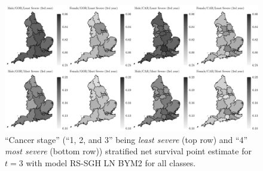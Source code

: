 \documentclass[10pt, aspectratio = 169, handout]{beamer} %
\begin{document}
    \begin{frame}[t]
		\frametitle{}
		\justifying
        \vspace{-2pt}
        \begin{figure}[!ht]
            \centering
            \includegraphics[width = 1\textwidth]{Images/cs01-t3-mean-cancer.jpg}
            \caption{``Cancer stage'' (``1, 2, and 3'' being \textit{least severe} (top row) and ``4'' \textit{most severe} (bottom row)) stratified net survival point estimate for $t = 3$ with model RS-SGH LN BYM2 for all classes.}
            \label{fig:cs01-t3-mean-cancer}
        \end{figure}  
	\end{frame}
\end{document}
